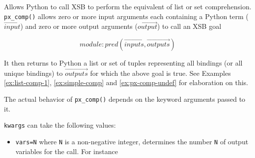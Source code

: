 \begin{description}
%
%
%     

%
  
  Allows Python to call XSB to perform the equivalent of list or set
  comprehension.  {\tt px\_comp()} allows zero or more input arguments
  each containing a Python term ($\overrightarrow{input}$) and zero or
  more output arguments ($\overrightarrow{output}$) to call an XSB goal

\[module:pred(\overrightarrow{inputs},\overrightarrow{outputs}) \]

It then returns to Python a list or set of tuples representing all
bindings (or all unique bindings) to $\overrightarrow{outputs}$ for
which the above goal is true.  See Examples \ref{ex:list-comp-1},
\ref{ex:simple-comp} and \ref{ex:px-comp-undef} for elaboration on
this.

The actual behavior of {\tt px\_comp()} depends on the keyword
arguments passed to it.

{\tt kwargs} can take the following values:
\begin{itemize}
  \item {\tt vars=N} where {\tt N} is a non-negative integer,
    determines the number {\tt N} of output variables for the call.
    For instance
    

\end{itemize}
\end{description}
